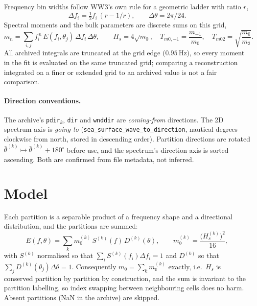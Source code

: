 \documentclass[11pt,a4paper]{article}
\newcommand{\Hs}{H_s}
\begin{document}
Frequency bin widths follow WW3's own rule for a geometric ladder with ratio $r$,
\begin{equation}
\Delta f_i = \tfrac12 f_i\,(r - 1/r), \qquad \Delta\theta = 2\pi/24 .
\end{equation}
Spectral moments and the bulk parameters are discrete sums on this grid,
\begin{equation}
m_n = \sum_{i,j} f_i^{\,n}\,E(f_i,\theta_j)\,\Delta f_i\,\Delta\theta,\qquad
\Hs = 4\sqrt{m_0},\quad T_{m0,-1} = \frac{m_{-1}}{m_0},\quad T_{m02} = \sqrt{\frac{m_0}{m_2}} .
\end{equation}
All archived integrals are truncated at the grid edge ($0.95\,$Hz), so every moment in the fit is
evaluated on the same truncated grid; comparing a reconstruction integrated on a finer or extended
grid to an archived value is not a fair comparison.

\paragraph{Direction conventions.} The archive's \texttt{pdir}$_k$, \texttt{dir} and \texttt{wnddir}
are \emph{coming-from} directions. The 2D spectrum axis is \emph{going-to}
(\texttt{sea\_surface\_wave\_to\_direction}, nautical degrees clockwise from north, stored in
descending order). Partition directions are rotated $\bar\theta^{(k)} \mapsto \bar\theta^{(k)} + 180^\circ$
before use, and the spectrum's direction axis is sorted ascending. Both are confirmed from file
metadata, not inferred.

\section{Model}

Each partition is a separable product of a frequency shape and a directional distribution, and the
partitions are summed:
\begin{equation}
E(f,\theta) = \sum_{k} m_0^{(k)}\, S^{(k)}(f)\, D^{(k)}(\theta),
\qquad m_0^{(k)} = \frac{\big(\Hs^{(k)}\big)^2}{16},
\label{eq:model}
\end{equation}
with $S^{(k)}$ normalised so that $\sum_i S^{(k)}(f_i)\Delta f_i = 1$ and $D^{(k)}$ so that
$\sum_j D^{(k)}(\theta_j)\Delta\theta = 1$. Consequently
$m_0 = \sum_k m_0^{(k)}$ exactly, i.e.\ $\Hs$ is conserved partition by partition by construction,
and the sum is invariant to the partition labelling, so index swapping between neighbouring cells
does no harm. Absent partitions (NaN in the archive) are skipped.
\end{document}
